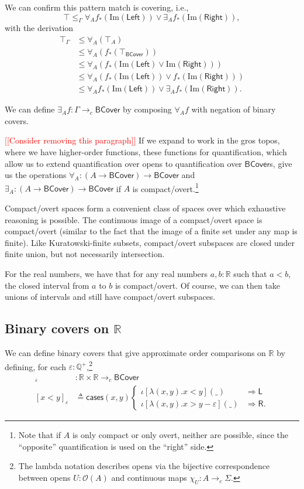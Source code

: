 \documentclass[conference]{IEEEtran}
\newcommand{\cto}{\to_c}
\newcommand{\R}{\mathbb{R}}
\newcommand{\rat}{\mathbb{Q}}
\newcommand{\Open}[1]{\mathcal{O}({#1})}
\newcommand{\wildcard}{\_}
\newcommand{\Img}[1]{\text{Im}\left({#1}\right)}
\newcommand{\oinclf}[1]{\iota[{#1}]}
\newcommand{\oincl}[2]{\oinclf{#1} \left({#2}\right)}
\newcommand{\Branch}{\Rightarrow}
\newcommand{\note}[1]{\textcolor{red}{[[{#1}]]}}
\newcommand{\BCover}{\mathsf{BCover}}
\begin{document}
We can confirm this pattern match is covering, i.e.,
\[
\top \le_\Gamma \forall_A f_*(\Img{\mathsf{Left}}) \vee \exists_A f_*(\Img{\mathsf{Right}}),
\]
with the derivation
\begin{align*}
\top_\Gamma 
  &\le \forall_A (\top_A) \tag{$\forall_A$ adjointness}
\\ &\le \forall_A (f_*(\top_\BCover)) \tag{$f_*$ preserves $\top$}
\\ &\le \forall_A (f_*(\Img{\mathsf{Left}} \vee \Img{\mathsf{Right}}))
\\ &\le \forall_A(f_*(\Img{\mathsf{Left}}) \vee f_*(\Img{\mathsf{Right}}))  \tag{$f_*$ preserves joins}
\\ &\le \forall_A f_*(\Img{\mathsf{Left}}) \vee \exists_A f_*(\Img{\mathsf{Right}}) \tag{$A$ is compact/overt}.
\end{align*}

We can define $\exists_A f : \Gamma \cto \BCover$ by composing $\forall_A f$ with negation of binary covers.

\note{Consider removing this paragraph} If we expand to work in the gros topos, where we have higher-order functions, these functions for quantification, which allow us to extend quantification over opens to quantification over $\BCover$s, give us the operations $\forall_A : (A \to \BCover) \to \BCover$ and $\exists_A : (A \to \BCover) \to \BCover$ if $A$ is compact/overt.\footnote{Note that if $A$ is only compact or only overt, neither are possible, since the ``opposite'' quantification is used on the ``right'' side.}

Compact/overt spaces form a convenient class of spaces over which exhaustive reasoning is possible. The continuous image of a compact/overt space is compact/overt (similar to the fact that the image of a finite set under any map is finite). Like Kuratowski-finite subsets, compact/overt subspaces are closed under finite union, but not necessarily intersection.

For the real numbers, we have that for any real numbers $a, b : \R$ such that $a < b$, the closed interval from $a$ to $b$ is compact/overt. Of course, we can then take unions of intervals and still have compact/overt subspaces.

\subsection{Binary covers on $\R$}

We can define binary covers that give approximate order comparisons on $\R$ by defining, for each $\varepsilon : \rat^+$,\footnote{The lambda notation describes opens via the bijective correspondence between opens $U : \Open{A}$ and continuous maps $\chi_U : A \cto \Sigma$.}
\begin{align*}
[ \cdot < \cdot ]_\varepsilon &: \R \times \R \cto \BCover
\\ [x < y]_\varepsilon &\triangleq \mathsf{cases}(x, y)
\begin{cases}
\oincl{\lambda (x, y). x < y}{\wildcard} &\Branch \mathsf{L}
\\ \oincl{\lambda (x, y). x > y - \varepsilon}{\wildcard} &\Branch \mathsf{R}.
\end{cases}
\end{align*}
\end{document}
